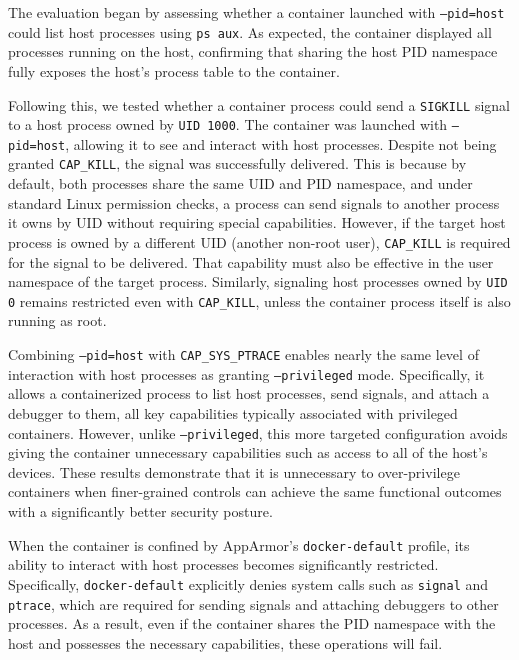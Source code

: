 \begin{doublespace}
The evaluation began by assessing whether a container launched with \texttt{--pid=host} could list host processes using \texttt{ps aux}. As expected, the container displayed all processes running on the host, confirming that sharing the host PID namespace fully exposes the host's process table to the container.

Following this, we tested whether a container process could send a \texttt{SIGKILL} signal to a host process owned by \texttt{UID 1000}. The container was launched with \texttt{--pid=host}, allowing it to see and interact with host processes. Despite not being granted \texttt{CAP\_KILL}, the signal was successfully delivered. This is because by default, both processes share the same UID and PID namespace, and under standard Linux permission checks, a process can send signals to another process it owns by UID without requiring special capabilities. However, if the target host process is owned by a different UID (another non-root user), \texttt{CAP\_KILL} is required for the signal to be delivered. That capability must also be effective in the user namespace of the target process. Similarly, signaling host processes owned by \texttt{UID 0} remains restricted even with \texttt{CAP\_KILL}, unless the container process itself is also running as root.

Combining \texttt{--pid=host} with \texttt{CAP\_SYS\_PTRACE} enables nearly the same level of interaction with host processes as granting \texttt{--privileged} mode. Specifically, it allows a containerized process to list host processes, send signals, and attach a debugger to them, all key capabilities typically associated with privileged containers. However, unlike \texttt{--privileged}, this more targeted configuration avoids giving the container unnecessary capabilities such as access to all of the host's devices. These results demonstrate that it is unnecessary to over-privilege containers when finer-grained controls can achieve the same functional outcomes with a significantly better security posture.

When the container is confined by AppArmor's \texttt{docker-default} profile, its ability to interact with host processes becomes significantly restricted. Specifically, \texttt{docker-default} explicitly denies system calls such as \texttt{signal} and \texttt{ptrace}, which are required for sending signals and attaching debuggers to other processes. As a result, even if the container shares the PID namespace with the host and possesses the necessary capabilities, these operations will fail. 


\end{doublespace}

